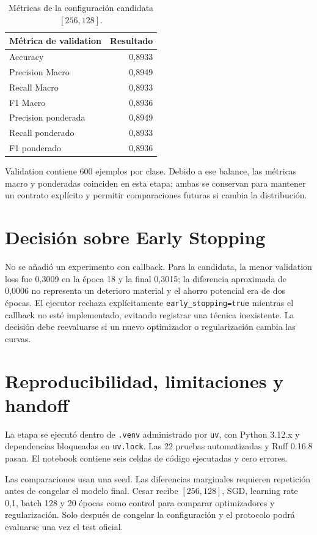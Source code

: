 \documentclass[10pt,a4paper]{article}
\begin{document}
\begin{table}[H]
\centering
\begin{tabular}{lr}
\toprule
Métrica de validation & Resultado \\
\midrule
Accuracy & 0,8933 \\
Precision Macro & 0,8949 \\
Recall Macro & 0,8933 \\
F1 Macro & 0,8936 \\
Precision ponderada & 0,8949 \\
Recall ponderado & 0,8933 \\
F1 ponderado & 0,8936 \\
\bottomrule
\end{tabular}
\caption{Métricas de la configuración candidata $[256,128]$.}
\end{table}

Validation contiene 600 ejemplos por clase. Debido a ese balance, las métricas macro y ponderadas coinciden en esta etapa; ambas se conservan para mantener un contrato explícito y permitir comparaciones futuras si cambia la distribución.

\section{Decisión sobre Early Stopping}

No se añadió un experimento con callback. Para la candidata, la menor validation loss fue 0,3009 en la época 18 y la final 0,3015; la diferencia aproximada de 0,0006 no representa un deterioro material y el ahorro potencial era de dos épocas. El ejecutor rechaza explícitamente \texttt{early\_stopping=true} mientras el callback no esté implementado, evitando registrar una técnica inexistente. La decisión debe reevaluarse si un nuevo optimizador o regularización cambia las curvas.

\section{Reproducibilidad, limitaciones y handoff}

La etapa se ejecutó dentro de \texttt{.venv} administrado por \texttt{uv}, con Python 3.12.x y dependencias bloqueadas en \texttt{uv.lock}. Las 22 pruebas automatizadas y Ruff 0.16.8 pasan. El notebook  contiene seis celdas de código ejecutadas y cero errores.

Las comparaciones usan una seed. Las diferencias marginales requieren repetición antes de congelar el modelo final. Cesar recibe $[256,128]$, SGD, learning rate 0,1, batch 128 y 20 épocas como control para comparar optimizadores y regularización. Solo después de congelar la configuración y el protocolo podrá evaluarse una vez el test oficial.
\end{document}
